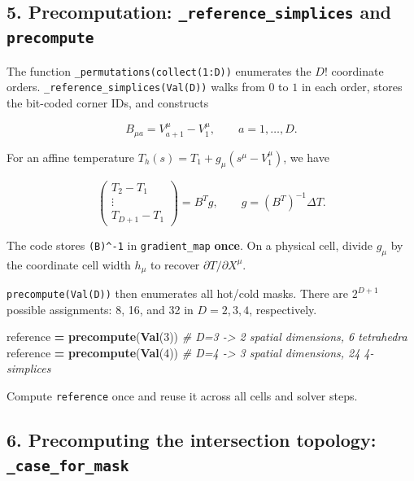 \documentclass[
  10pt,
]{article}
\newenvironment{Shaded}{\begin{snugshade}}{\end{snugshade}}
\newcommand{\CommentTok}[1]{\textcolor[rgb]{0.56,0.35,0.01}{\textit{#1}}}
\newcommand{\FloatTok}[1]{\textcolor[rgb]{0.00,0.00,0.81}{#1}}
\newcommand{\FunctionTok}[1]{\textcolor[rgb]{0.13,0.29,0.53}{\textbf{#1}}}
\newcommand{\NormalTok}[1]{#1}
\newcommand{\OperatorTok}[1]{\textcolor[rgb]{0.81,0.36,0.00}{\textbf{#1}}}
\begin{document}
\subsection{\texorpdfstring{5. Precomputation:
\texttt{\_reference\_simplices} and
\texttt{precompute}}{5. Precomputation: \_reference\_simplices and precompute}}\label{precomputation-_reference_simplices-and-precompute}

The function \texttt{\_permutations(collect(1:D))} enumerates the \(D!\)
coordinate orders. \texttt{\_reference\_simplices(Val(D))} walks from
\(0\) to \(1\) in each order, stores the bit-coded corner IDs, and
constructs

\[
B_{\mu a}=V_{a+1}^{\mu}-V_1^{\mu},\qquad a=1,\ldots,D.
\]

For an affine temperature \(T_h(s)=T_1+g_\mu(s^\mu-V_1^\mu)\), we have

\[
\begin{pmatrix}T_2-T_1\\ \vdots\\T_{D+1}-T_1\end{pmatrix}
=B^T g,
\qquad g=(B^T)^{-1}\Delta T.
\]

The code stores \texttt{(B\textquotesingle{})\^{}-1} in
\texttt{gradient\_map} \textbf{once}. On a physical cell, divide
\(g_\mu\) by the coordinate cell width \(h_\mu\) to recover
\(\partial T/\partial X^\mu\).

\texttt{precompute(Val(D))} then enumerates all hot/cold masks. There
are \(2^{D+1}\) possible assignments: 8, 16, and 32 in \(D=2,3,4\),
respectively.

\begin{Shaded}
\begin{Highlighting}[]
\NormalTok{reference }\OperatorTok{=} \FunctionTok{precompute}\NormalTok{(}\FunctionTok{Val}\NormalTok{(}\FloatTok{3}\NormalTok{))  }\CommentTok{\# D=3 {-}\textgreater{} 2 spatial dimensions, 6 tetrahedra}
\NormalTok{reference }\OperatorTok{=} \FunctionTok{precompute}\NormalTok{(}\FunctionTok{Val}\NormalTok{(}\FloatTok{4}\NormalTok{))  }\CommentTok{\# D=4 {-}\textgreater{} 3 spatial dimensions, 24 4{-}simplices}
\end{Highlighting}
\end{Shaded}

Compute \texttt{reference} once and reuse it across all cells and solver
steps.

\subsection{\texorpdfstring{6. Precomputing the intersection topology:
\texttt{\_case\_for\_mask}}{6. Precomputing the intersection topology: \_case\_for\_mask}}\label{precomputing-the-intersection-topology-_case_for_mask}
\end{document}
